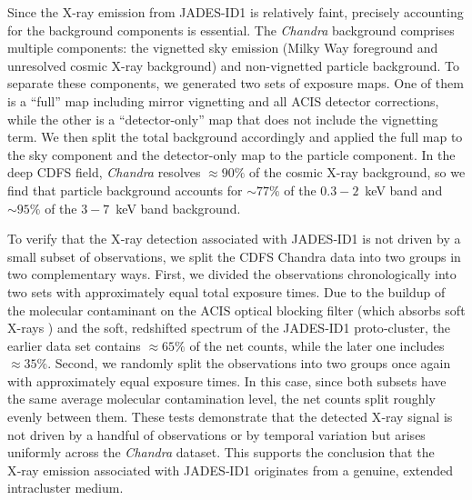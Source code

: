 \documentclass[pdflatex,sn-mathphys-num]{sn-jnl}
\theoremstyle{thmstyleone}
\theoremstyle{thmstyletwo}
\theoremstyle{thmstylethree}
\begin{document}
Since the X-ray emission from JADES-ID1 is relatively faint, precisely accounting for the background components is essential. The \textit{Chandra} background comprises multiple components: the vignetted sky emission (Milky Way foreground and unresolved cosmic X-ray background) and non-vignetted particle background. To separate these components, we generated two sets of exposure maps. One of them is a ``full'' map including mirror vignetting and all ACIS detector corrections, while the other is  a ``detector-only'' map that does not include the vignetting term. We then split the total background accordingly and applied the full map to the sky component and the detector-only map to the particle component. In the deep CDFS field, \textit{Chandra} resolves $\approx90\%$ of the cosmic X-ray background, so we find that particle background accounts for  $\sim77\%$ of the $0.3-2$~keV band and $\sim95\%$ of the $3-7$~keV band background.

To verify that the X‑ray detection associated with JADES‑ID1 is not driven by a small subset of observations, we split the CDFS Chandra data into two groups in two complementary ways. First, we divided the observations chronologically into two sets with approximately equal total exposure times. Due to the buildup of the molecular contaminant on the ACIS optical blocking filter (which absorbs soft X-rays \cite{2018SPIE10699E..6BP,2022SPIE12181E..6XP}) and the soft, redshifted spectrum of the JADES‑ID1 proto‑cluster, the earlier data set contains $\approx65\%$ of the net counts, while the later one includes $\approx35\%$. Second, we randomly split the observations into two groups once again with approximately equal exposure times. In this case, since both subsets have the same average molecular contamination level, the net counts split roughly evenly between them. These tests demonstrate that the detected X‑ray signal is not driven by a handful of observations or by temporal variation but arises uniformly across the \textit{Chandra} dataset. This supports the conclusion that the X‑ray emission associated with JADES‑ID1 originates from a genuine, extended intracluster medium.
\end{document}
